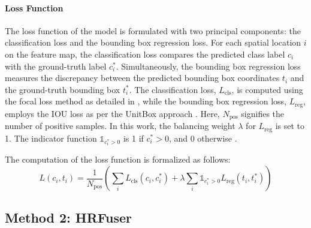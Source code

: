 \documentclass[report.tex]{subfiles}
\begin{document}

    \paragraph*{Loss Function}

    The loss function of the model is formulated with two principal components: the classification loss and the bounding box regression loss. For each spatial location \( i \) on the feature map, the classification loss compares the predicted class label \( c_i \) with the ground-truth label \( c_i^* \). Simultaneously, the bounding box regression loss measures the discrepancy between the predicted bounding box coordinates \( t_i \) and the ground-truth bounding box \( t_i^* \). The classification loss, \( L_{\text{cls}} \), is computed using the focal loss method as detailed in \cite{lin2017focal}, while the bounding box regression loss, \( L_{\text{reg}} \), employs the IOU loss as per the UnitBox approach \cite{yu2016unitbox}. Here, \( N_{\text{pos}} \) signifies the number of positive samples. In this work, the balancing weight \( \lambda \) for \( L_{\text{reg}} \) is set to 1. The indicator function \( \mathds{1}_{c_i^*>0} \) is 1 if \( c_i^* > 0 \), and 0 otherwise \cite{chang2020spatial}.

    The computation of the loss function is formalized as follows:
    \begin{equation}
        L(c_i, t_i) = \frac{1}{N_{\text{pos}}} \left( \sum_{i} L_{\text{cls}}(c_i, c_i^*) + \lambda \sum_{i} \mathds{1}_{c_i^*>0} L_{\text{reg}}(t_i, t_i^*) \right)
    \end{equation}


    \subsection{Method 2: HRFuser}
        
\end{document}
